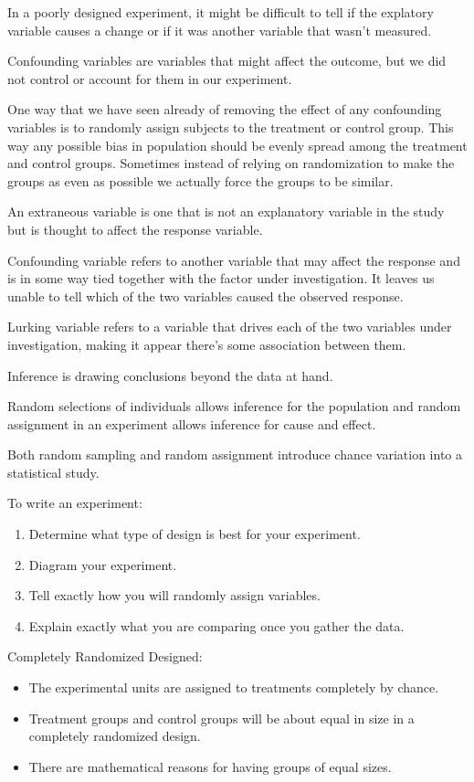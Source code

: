 \documentclass[../stats.tex]{subfiles}
\begin{document}
In a poorly designed experiment, it might be difficult to tell if the explatory variable causes a change or if it was another variable that wasn't measured.

Confounding variables are variables that might affect the outcome, but we did not control or account for them in our experiment. 

One way that we have seen already of removing the effect of any confounding variables is to randomly assign subjects to the treatment or control group.
This way any possible bias in population should be evenly spread among the treatment and control groups. Sometimes instead of relying on randomization
to make the groups as even as possible we actually force the groups to be similar.

An extraneous variable is one that is not an explanatory variable in the study but is thought to affect the response variable.

Confounding variable refers to another variable that may affect the response and is in some way tied together with the factor under investigation. It leaves us unable to tell which of the two variables caused the observed response.

Lurking variable refers to a variable that drives each of the two variables under investigation, making it appear there's some association between them. 

Inference is drawing conclusions beyond the data at hand. 

Random selections of individuals allows inference for the population and random assignment in an experiment allows inference for cause and effect.

Both random sampling and random assignment introduce chance variation into a statistical study. 

To write an experiment:
\begin{enumerate}
    \item Determine what type of design is best for your experiment.
    \item Diagram your experiment.
    \item Tell exactly how you will randomly assign variables.
    \item Explain exactly what you are comparing once you gather the data.
\end{enumerate}

Completely Randomized Designed:
\begin{itemize}
    \item The experimental units are assigned to treatments completely by chance.
    \item Treatment groups and control groups will be about equal in size in a completely randomized design.
    \item There are mathematical reasons for having groups of equal sizes.
\end{itemize}
\end{document}
